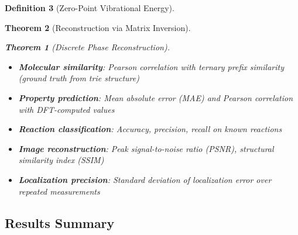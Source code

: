 \documentclass[11pt,a4paper]{article}
\newtheorem{theorem}{Theorem}[section]
\theoremstyle{definition}
\newtheorem{definition}[theorem]{Definition}
\theoremstyle{remark}
\begin{document}
\begin{definition}[Zero-Point Vibrational Energy]
\begin{theorem}[Reconstruction via Matrix Inversion]
\begin{theorem}[Discrete Phase Reconstruction]
\begin{itemize}
\item \textbf{Molecular similarity}: Pearson correlation with ternary prefix similarity (ground truth from trie structure)
\item \textbf{Property prediction}: Mean absolute error (MAE) and Pearson correlation with DFT-computed values
\item \textbf{Reaction classification}: Accuracy, precision, recall on known reactions
\item \textbf{Image reconstruction}: Peak signal-to-noise ratio (PSNR), structural similarity index (SSIM)
\item \textbf{Localization precision}: Standard deviation of localization error over repeated measurements
\end{itemize}

\subsection{Results Summary}


\end{theorem}
\end{theorem}
\end{definition}
\end{document}
